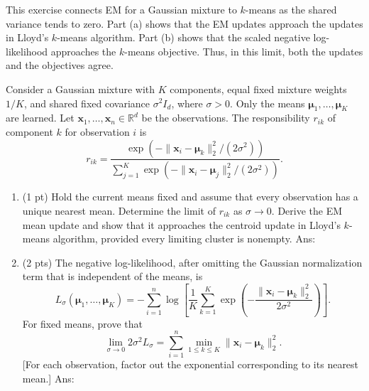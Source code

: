 \documentclass[10pt,letterpaper]{article}
\newcommand{\xv}{\mathbf{x}}
\newcommand{\ans}[1]{{\color{orange}\textsf{Ans}: #1}}
\begin{document}
\clearpage
\begin{exercise}
This exercise connects EM for a Gaussian mixture to $k$-means as the shared variance tends to zero. Part (a) shows that the EM updates approach the updates in Lloyd's $k$-means algorithm. Part (b) shows that the scaled negative log-likelihood approaches the $k$-means objective. Thus, in this limit, both the updates and the objectives agree.


Consider a Gaussian mixture with $K$ components, equal fixed mixture weights $1/K$, and shared fixed covariance $\sigma^2 I_d$, where $\sigma>0$. Only the means $\boldsymbol\mu_1,\ldots,\boldsymbol\mu_K$ are learned. Let $\xv_1,\ldots,\xv_n\in\mathbb{R}^d$ be the observations.
The responsibility $r_{ik}$ of component $k$ for observation $i$ is
\[
r_{ik}=\frac{\exp(-\|\xv_i-\boldsymbol\mu_k\|_2^2/(2\sigma^2))}
{\sum_{j=1}^K\exp(-\|\xv_i-\boldsymbol\mu_j\|_2^2/(2\sigma^2))}.
\]
\begin{enumerate}[label=\alph*)]
\item (1 pt) Hold the current means fixed and assume that every observation has a unique nearest mean. Determine the limit of $r_{ik}$ as $\sigma\to0$. Derive the EM mean update and show that it approaches the centroid update in Lloyd's $k$-means algorithm, provided every limiting cluster is nonempty.
\ans{}
\item (2 pts) The negative log-likelihood, after omitting the Gaussian normalization term that is independent of the means, is
\[
L_\sigma(\boldsymbol\mu_1,\ldots,\boldsymbol\mu_K)
=-\sum_{i=1}^n\log\left[\frac1K\sum_{k=1}^K
\exp\left(-\frac{\|\xv_i-\boldsymbol\mu_k\|_2^2}{2\sigma^2}\right)\right].
\]
For fixed means, prove that
\[
\lim_{\sigma\to0}2\sigma^2 L_\sigma
=\sum_{i=1}^n\min_{1\leq k\leq K}\|\xv_i-\boldsymbol\mu_k\|_2^2.
\]
[For each observation, factor out the exponential corresponding to its nearest mean.]
\ans{}
\end{enumerate}
\end{exercise}
\end{document}
